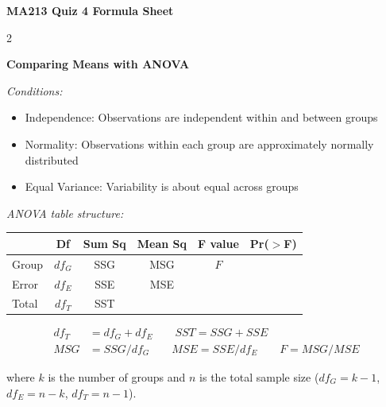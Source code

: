 \documentclass[8pt]{article}
\begin{document}
\begin{center}
    {\LARGE \textbf{MA213 Quiz 4 Formula Sheet}}
\end{center}

\vspace{1em}





\clearpage

\begin{multicols}{2} %







\clearpage

\textbf{Comparing Means with ANOVA}

\textit{Conditions:}
\begin{itemize}
    \item Independence: Observations are independent within and between groups
    \item Normality: Observations within each group are approximately normally distributed
    \item Equal Variance: Variability is about equal across groups
\end{itemize}

\textit{ANOVA table structure:}

{\footnotesize
\begin{center}
\begin{tabular}{l c c c c c}
\hline
 & Df & Sum Sq & Mean Sq & F value & Pr($>$F) \\
\hline
Group & $df_G$ & SSG & MSG & $F$ & \\
Error & $df_E$ & SSE & MSE & & \\
\hline
Total & $df_T$ & SST & & & \\
\hline
\end{tabular}
\end{center}
}

{\small
\begin{align*}
    df_T &= df_G + df_E \qquad SST = SSG + SSE \\
    MSG &= SSG / df_G \qquad MSE = SSE / df_E \qquad F = MSG / MSE
\end{align*}
}

where $k$ is the number of groups and $n$ is the total sample size ($df_G = k-1$, $df_E = n-k$, $df_T = n-1$).

\end{multicols} %
\end{document}
